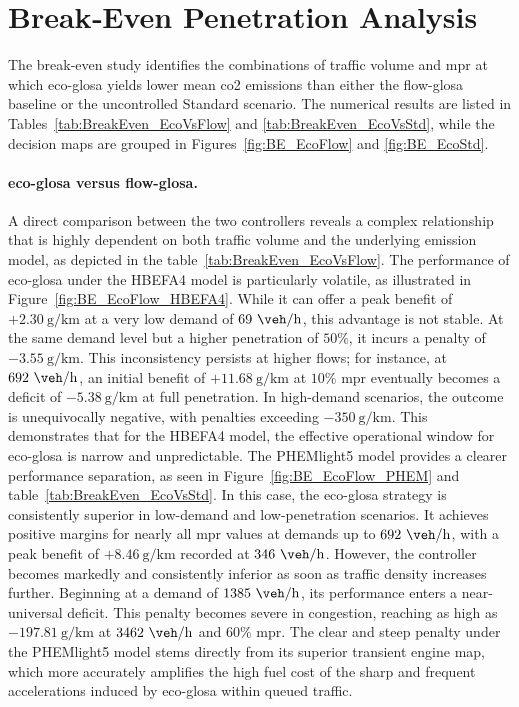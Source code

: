\section{Break‐Even Penetration Analysis}
\label{sec:Results_BreakEven}

The break-even study identifies the combinations of traffic volume and \ac{mpr} at which \ac{eco-glosa} yields lower mean \ac{co2} emissions than either the \ac{flow-glosa} baseline or the uncontrolled Standard scenario. The numerical results are listed in Tables~\vref{tab:BreakEven_EcoVsFlow} and \vref{tab:BreakEven_EcoVsStd}, while the decision maps are grouped in Figures~\vref{fig:BE_EcoFlow} and \vref{fig:BE_EcoStd}.

\paragraph{\ac{eco-glosa} versus \ac{flow-glosa}.}
A direct comparison between the two controllers reveals a complex relationship that is highly dependent on both traffic volume and the underlying emission model, as depicted in the table~\vref{tab:BreakEven_EcoVsFlow}. The performance of \ac{eco-glosa} under the HBEFA4 model is particularly volatile, as illustrated in Figure~\vref{fig:BE_EcoFlow_HBEFA4}. While it can offer a peak benefit of $+2.30~\unit{\gram\per\kilo\metre}$ at a very low demand of $69~\unit{\veh\per\hour}$, this advantage is not stable. At the same demand level but a higher penetration of $50\%$, it incurs a penalty of $-3.55~\unit{\gram\per\kilo\metre}$. This inconsistency persists at higher flows; for instance, at $692~\unit{\veh\per\hour}$, an initial benefit of $+11.68~\unit{\gram\per\kilo\metre}$ at $10\%$ \ac{mpr} eventually becomes a deficit of $-5.38~\unit{\gram\per\kilo\metre}$ at full penetration. In high-demand scenarios, the outcome is unequivocally negative, with penalties exceeding $-350~\unit{\gram\per\kilo\metre}$. This demonstrates that for the HBEFA4 model, the effective operational window for \ac{eco-glosa} is narrow and unpredictable.
\mynewline
The PHEMlight5 model provides a clearer performance separation, as seen in Figure~\vref{fig:BE_EcoFlow_PHEM} and table~\vref{tab:BreakEven_EcoVsStd}. In this case, the \ac{eco-glosa} strategy is consistently superior in low-demand and low-penetration scenarios. It achieves positive margins for nearly all \ac{mpr} values at demands up to $692~\unit{\veh\per\hour}$, with a peak benefit of $+8.46~\unit{\gram\per\kilo\metre}$ recorded at $346~\unit{\veh\per\hour}$. However, the controller becomes markedly and consistently inferior as soon as traffic density increases further. Beginning at a demand of $1385~\unit{\veh\per\hour}$, its performance enters a near-universal deficit. This penalty becomes severe in congestion, reaching as high as $-197.81~\unit{\gram\per\kilo\metre}$ at $3462~\unit{\veh\per\hour}$ and $60\%$ \ac{mpr}. The clear and steep penalty under the PHEMlight5 model stems directly from its superior transient engine map, which more accurately amplifies the high fuel cost of the sharp and frequent accelerations induced by \ac{eco-glosa} within queued traffic.

